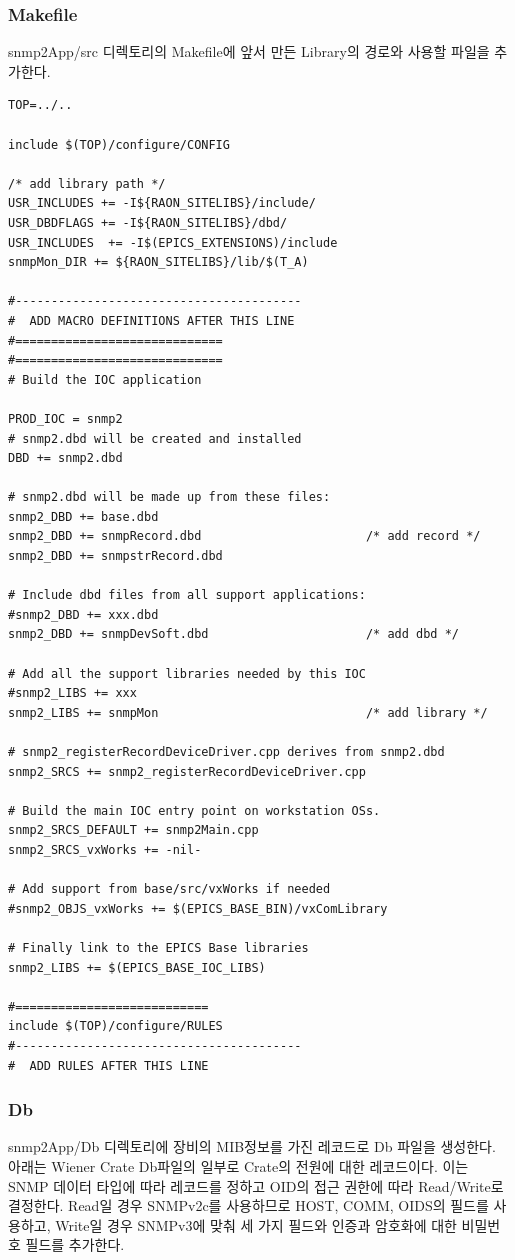 \documentclass[11pt
  , a4paper
  , article
  , oneside
]{memoir}
\begin{document}
\subsubsection{Makefile}
snmp2App/src 디렉토리의 Makefile에 앞서 만든 Library의 경로와 사용할 파일을 추가한다. 

{\scriptsize
\begin{lstlisting}[style=termstylenumber]
TOP=../..

include $(TOP)/configure/CONFIG

/* add library path */
USR_INCLUDES += -I${RAON_SITELIBS}/include/
USR_DBDFLAGS += -I${RAON_SITELIBS}/dbd/         
USR_INCLUDES  += -I$(EPICS_EXTENSIONS)/include
snmpMon_DIR += ${RAON_SITELIBS}/lib/$(T_A)

#----------------------------------------
#  ADD MACRO DEFINITIONS AFTER THIS LINE
#=============================
#=============================
# Build the IOC application

PROD_IOC = snmp2
# snmp2.dbd will be created and installed
DBD += snmp2.dbd                                   

# snmp2.dbd will be made up from these files:
snmp2_DBD += base.dbd
snmp2_DBD += snmpRecord.dbd                       /* add record */
snmp2_DBD += snmpstrRecord.dbd    

# Include dbd files from all support applications:
#snmp2_DBD += xxx.dbd
snmp2_DBD += snmpDevSoft.dbd                      /* add dbd */

# Add all the support libraries needed by this IOC
#snmp2_LIBS += xxx
snmp2_LIBS += snmpMon                             /* add library */

# snmp2_registerRecordDeviceDriver.cpp derives from snmp2.dbd
snmp2_SRCS += snmp2_registerRecordDeviceDriver.cpp

# Build the main IOC entry point on workstation OSs.
snmp2_SRCS_DEFAULT += snmp2Main.cpp
snmp2_SRCS_vxWorks += -nil-

# Add support from base/src/vxWorks if needed
#snmp2_OBJS_vxWorks += $(EPICS_BASE_BIN)/vxComLibrary

# Finally link to the EPICS Base libraries
snmp2_LIBS += $(EPICS_BASE_IOC_LIBS)

#===========================
include $(TOP)/configure/RULES
#----------------------------------------
#  ADD RULES AFTER THIS LINE
\end{lstlisting}
}

\subsubsection{Db}
snmp2App/Db 디렉토리에 장비의 MIB정보를 가진 레코드로 Db 파일을 생성한다. 아래는 Wiener Crate Db파일의 일부로 Crate의 전원에 대한 레코드이다. 이는 SNMP 데이터 타입에 따라 레코드를 정하고 OID의 접근 권한에 따라 Read/Write로 결정한다. Read일 경우 SNMPv2c를 사용하므로 HOST, COMM, OIDS의 필드를 사용하고, Write일 경우 SNMPv3에 맞춰 세 가지 필드와 인증과 암호화에 대한 비밀번호 필드를 추가한다. 
\end{document}
